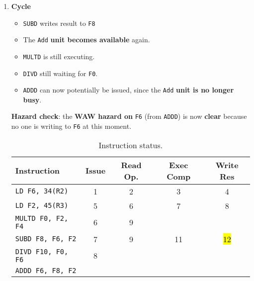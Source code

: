 \begin{enumerate}
    \newpage


    \item \textbf{Cycle \theenumi}
    \begin{itemize}
        \item[\textcolor{Green3}{\faIcon{check}}] \texttt{SUBD} writes result to \texttt{F8}
        \item[\textcolor{Green3}{\faIcon{check}}] The \texttt{Add} \textbf{unit becomes available} again.
        \item \texttt{MULTD} is still executing.
        \item \texttt{DIVD} still waiting for \texttt{F0}.
        \item \texttt{ADDD} can now potentially be issued, since the \texttt{Add} \textbf{unit is no longer busy}.
    \end{itemize}
    \textbf{Hazard check}: the \textbf{WAW hazard on} \texttt{F6} (from \texttt{ADDD}) is now \textbf{clear} because no one is writing to \texttt{F6} at this moment.

    \begin{table}[!htp]
        \centering
        \begin{tabular}{@{} l | c c c c @{}}
            \toprule
            Instruction                 & Issue & Read Op.  & Exec Comp & Write Res \\
            \midrule
            \texttt{LD    F6, 34(R2)}   & 1     & 2         & 3         & 4         \\ [.3em]
            \texttt{LD    F2, 45(R3)}   & 5     & 6         & 7         & 8         \\ [.3em]
            \texttt{MULTD F0, F2, F4}   & 6     & 9         &           &           \\ [.3em]
            \texttt{SUBD  F8, F6, F2}   & 7     & 9         & 11        & \hl{12}   \\ [.3em]
            \texttt{DIVD  F10, F0, F6}  & 8     &           &           &           \\ [.3em]
            \texttt{ADDD  F6, F8, F2}   &       &           &           &           \\
            \bottomrule
        \end{tabular}
        \caption*{Instruction status.}
    \end{table}


\end{enumerate}
